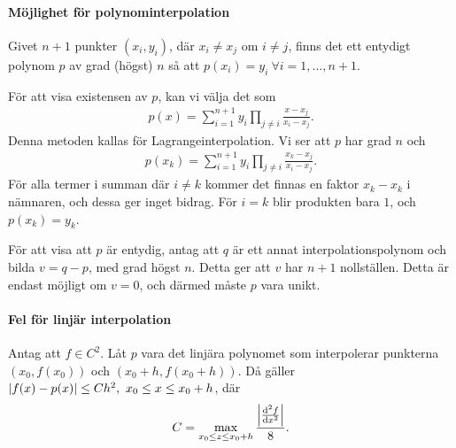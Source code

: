 \paragraph{Möjlighet för polynominterpolation}
Givet $n + 1$ punkter $(x_{i}, y_{i})$, där $x_{i}\neq x_{j}$ om $i\neq j$, finns det ett entydigt polynom $p$ av grad (högst) $n$ så att $p(x_{i}) = y_{i}\ \forall i= 1, \dots, n + 1$.

\proof
För att visa existensen av $p$, kan vi välja det som
\begin{align*}
	p(x) = \sum\limits_{i = 1}^{n + 1}y_{i}\prod\limits_{j\neq i}\frac{x - x_{j}}{x_{i} - x_{j}}.
\end{align*}
Denna metoden kallas för Lagrangeinterpolation. Vi ser att $p$ har grad $n$ och
\begin{align*}
	p(x_{k}) = \sum\limits_{i = 1}^{n + 1}y_{i}\prod\limits_{j\neq i}\frac{x_{k} - x_{j}}{x_{i} - x_{j}}.
\end{align*}
För alla termer i summan där $i\neq k$ kommer det finnas en faktor $x_{k} - x_{k}$ i nämnaren, och dessa ger inget bidrag. För $i = k$ blir produkten bara $1$, och $p(x_{k}) = y_{k}$.

För att visa att $p$ är entydig, antag att $q$ är ett annat interpolationspolynom och bilda $v = q - p$, med grad högst $n$. Detta ger att $v$ har $n + 1$ nollställen. Detta är endast möjligt om $v = 0$, och därmed måste $p$ vara unikt.

\paragraph{Fel för linjär interpolation}
Antag att $f\in C^{2}$. Låt $p$ vara det linjära polynomet som interpolerar punkterna $(x_{0}, f(x_{0}))$ och $(x_{0} + h, f(x_{0} + h))$. Då gäller $\abs{f(x) - p(x)} \leq Ch^{2},\ x_{0} \leq x \leq x_{0} + h$, där
\begin{align*}
	C = \max\limits_{x_{0} \leq z \leq x_{0} + h}\frac{\abs{\dv[2]{f}{x} (z)}}{8}.
\end{align*}

